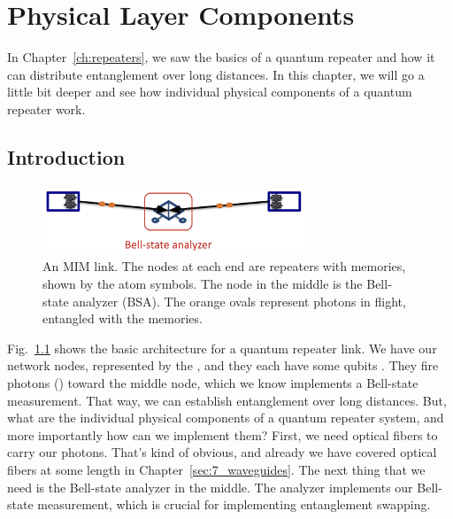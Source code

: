 
\chapter{Physical Layer Components}

In Chapter~\ref{ch:repeaters}, we saw the basics of a quantum repeater and how it can distribute entanglement over long distances. In this chapter, we will go a little bit deeper and see how individual physical components of a quantum repeater work.

\section{Introduction}

\begin{figure}[t]
    \centering
    \includegraphics[width=0.7\textwidth]{lesson13/MIM-link.png}
    \caption[MIM link hardware]{An MIM link. The nodes at each end are repeaters with memories, shown by the atom symbols.  The node in the middle is the Bell-state analyzer (BSA).  The orange ovals represent photons in flight, entangled with the memories.}
    \label{fig:13-MIM-link}
\end{figure}


Fig.~\ref{fig:13-MIM-link} shows the basic architecture for a quantum repeater link. We have our network nodes, represented by the , and they each have some qubits .  They fire photons () toward the middle node, which we know implements a Bell-state measurement. That way, we can establish entanglement over long distances. But, what are the individual physical components of a quantum repeater system, and more importantly how can we implement them? First, we need optical fibers to carry our photons. That's kind of obvious, and already we have covered optical fibers at some length in Chapter~\ref{sec:7_waveguides}. The next thing that we need is the Bell-state analyzer in the middle. The analyzer implements our Bell-state measurement, which is crucial for implementing entanglement swapping.

